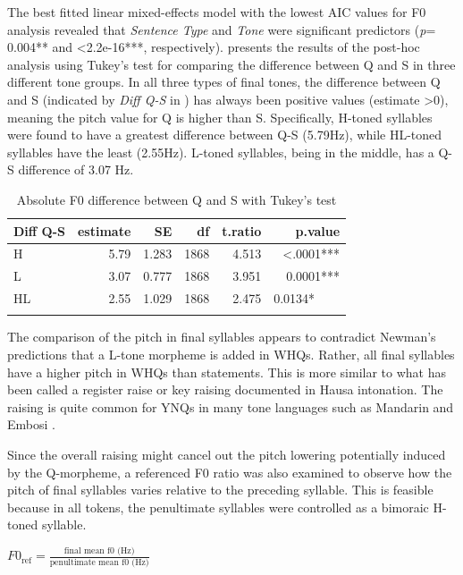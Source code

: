 \documentclass[output=paper,colorlinks,citecolor=brown
]{langscibook}
\begin{document}
The best fitted linear mixed-effects model with the lowest AIC values for F0 analysis revealed that \textit{Sentence Type} and \textit{Tone} were significant predictors (\textit{p}= 0.004** and <2.2e-16***, respectively).  presents the results of the post-hoc analysis using Tukey's test for comparing the difference between Q and S in three different tone groups. In all three types of final tones, the difference between Q and S (indicated by \textit{Diff Q-S }in ) has always been positive values (estimate >0), meaning the pitch value for Q is higher than S. Specifically, H-toned syllables were found to have a greatest difference between Q-S (5.79Hz), while HL-toned syllables have the least (2.55Hz). L-toned syllables, being in the middle, has a Q-S difference of 3.07 Hz.

\begin{table}
\begin{tabular}{lrrrrr}
\lsptoprule
Diff Q-S & estimate & SE & df & t.ratio & p.value\\
\midrule
H & 5.79& 1.283 &1868 &  4.513&  <.0001***\\
L  & 3.07 &0.777& 1868 &  3.951&  0.0001***\\
HL& 2.55 &1.029 &1868 &  2.475&  0.0134*~~~~\\
\lspbottomrule
\end{tabular}
\caption{Absolute F0 difference between Q and S with Tukey's test}
\label{tab:Li:f0abs}
\end{table}

The comparison of the pitch in final syllables appears to contradict Newman’s predictions that a L-tone morpheme is added in WHQs. Rather, all final syllables have a higher pitch in WHQs than statements. This is more similar to what has been called a register raise \citep{inkelas} or key raising \citep{newmangrammar} documented in Hausa intonation. The raising is quite common for YNQs in many tone languages such as Mandarin \citep{Shih} and Embosi \citep{embosi}.

Since the overall raising might cancel out the pitch lowering potentially induced by the Q-morpheme, a referenced F0 ratio was also examined to observe how the pitch of final syllables varies relative to the preceding syllable. This is feasible because in all tokens, the penultimate syllables were controlled as a bimoraic H-toned syllable. 

\ea
$F0_{\text{ref}} =  \frac{\text{final\ mean\ f0\ (Hz)}}{\text{penultimate \ mean \ f0\ (Hz)}}$
\z
\end{document}
